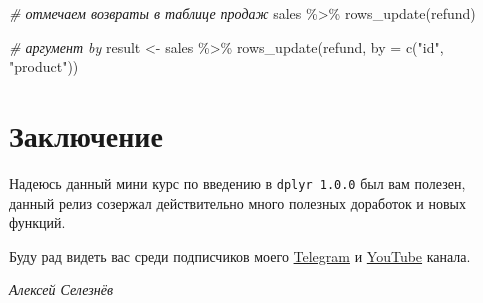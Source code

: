 \documentclass[
]{book}
\newenvironment{Shaded}{\begin{snugshade}}{\end{snugshade}}
\newcommand{\AttributeTok}[1]{\textcolor[rgb]{0.77,0.63,0.00}{#1}}
\newcommand{\CommentTok}[1]{\textcolor[rgb]{0.56,0.35,0.01}{\textit{#1}}}
\newcommand{\FunctionTok}[1]{\textcolor[rgb]{0.00,0.00,0.00}{#1}}
\newcommand{\NormalTok}[1]{#1}
\newcommand{\OtherTok}[1]{\textcolor[rgb]{0.56,0.35,0.01}{#1}}
\newcommand{\SpecialCharTok}[1]{\textcolor[rgb]{0.00,0.00,0.00}{#1}}
\newcommand{\StringTok}[1]{\textcolor[rgb]{0.31,0.60,0.02}{#1}}
\begin{document}
\begin{Shaded}
\begin{Highlighting}[]
\CommentTok{\# отмечаем возвраты в таблице продаж}
\NormalTok{sales }\SpecialCharTok{\%\textgreater{}\%}
  \FunctionTok{rows\_update}\NormalTok{(refund)}

\CommentTok{\# аргумент by}
\NormalTok{result }\OtherTok{\textless{}{-}}
\NormalTok{  sales }\SpecialCharTok{\%\textgreater{}\%}
    \FunctionTok{rows\_update}\NormalTok{(refund, }\AttributeTok{by =} \FunctionTok{c}\NormalTok{(}\StringTok{"id"}\NormalTok{, }\StringTok{"product"}\NormalTok{))}
\end{Highlighting}
\end{Shaded}

\hypertarget{ux437ux430ux43aux43bux44eux447ux435ux43dux438ux435}{%
\chapter*{Заключение}\label{ux437ux430ux43aux43bux44eux447ux435ux43dux438ux435}}

Надеюсь данный мини курс по введению в \texttt{dplyr\ 1.0.0} был вам полезен, данный релиз созержал действительно много полезных доработок и новых функций.

Буду рад видеть вас среди подписчиков моего \href{https://t.me/R4marketing}{Telegram} и \href{https://www.youtube.com/R4marketing/?sub_confirmation=1}{YouTube} канала.

\emph{Алексей Селезнёв}
\end{document}

